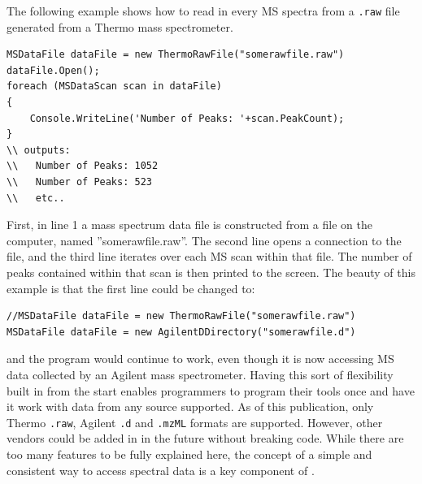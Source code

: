 The following example shows how to read in every MS spectra from a \texttt{.raw} file generated from a Thermo mass spectrometer.
\begin{lstlisting}
MSDataFile dataFile = new ThermoRawFile("somerawfile.raw")
dataFile.Open();                   
foreach (MSDataScan scan in dataFile)
{             
    Console.WriteLine('Number of Peaks: '+scan.PeakCount);
}
\\ outputs:
\\   Number of Peaks: 1052
\\   Number of Peaks: 523
\\   etc..
\end{lstlisting}
First, in line 1 a mass spectrum data file is constructed from a file on the computer, named ''somerawfile.raw''. The second line opens a connection to the file, and the third line iterates over each MS scan within that file. The number of peaks contained within that scan is then printed to the screen. The beauty of this example is that the first line could be changed to:
\begin{lstlisting}
//MSDataFile dataFile = new ThermoRawFile("somerawfile.raw")
MSDataFile dataFile = new AgilentDDirectory("somerawfile.d")
\end{lstlisting}
and the program would continue to work, even though it is now accessing MS data collected by an Agilent mass spectrometer. Having this sort of flexibility built in from the start enables programmers to program their tools once and have it work with data from any source supported. As of this publication, only Thermo \texttt{.raw}, Agilent \texttt{.d} and \texttt{.mzML} formats are supported. However, other vendors could be added in in the future without breaking code. While there are too many features to be fully explained here, the concept of a simple and consistent way to access spectral data is a key component of \csmsl{}. 


